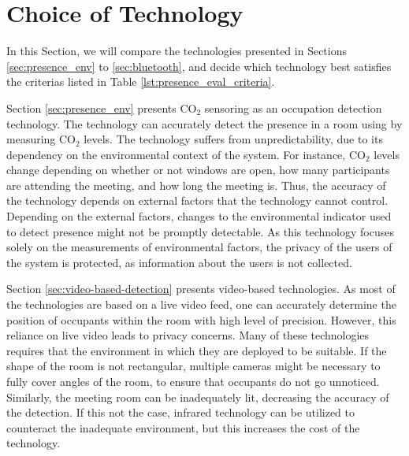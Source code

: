 \section{Choice of Technology}
In this Section, we will compare the technologies presented in Sections \ref{sec:presence_env} to \ref{sec:bluetooth}, and decide which technology best satisfies the criterias listed in Table \ref{lst:presence_eval_criteria}. 

Section \ref{sec:presence_env} presents $\text{CO}_{2}$ sensoring as an occupation detection technology. The technology can accurately detect the presence in a room using by measuring $\text{CO}_{2}$ levels.
The technology suffers from unpredictability, due to its dependency on the environmental context of the system.
For instance, $\text{CO}_{2}$ levels change depending on whether or not windows are open, how many participants are attending the meeting, and how long the meeting is.
Thus, the accuracy of the technology depends on external factors that the technology cannot control.
Depending on the external factors, changes to the environmental indicator used to detect presence might not be promptly detectable.
As this technology focuses solely on the measurements of environmental factors, the privacy of the users of the system is protected, as information about the users is not collected.

Section \ref{sec:video-based-detection} presents video-based technologies.
As most of the technologies are based on a live video feed, one can accurately determine the position of occupants within the room with high level of precision. 
However, this reliance on live video leads to privacy concerns.
Many of these technologies requires that the environment in which they are deployed to be suitable.
If the shape of the room is not rectangular, multiple cameras might be necessary to fully cover angles of the room, to ensure that occupants do not go unnoticed. 
Similarly, the meeting room can be inadequately lit, decreasing the accuracy of the detection.
If this not the case, infrared technology can be utilized to counteract the inadequate environment, but this increases the cost of the technology.   

